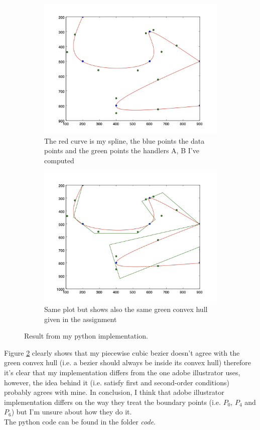 \documentclass[12pt]{article}
\begin{document}
\begin{figure}[H]
\centering
\begin{subfigure}{.5\textwidth}
  \centering
	\includegraphics[width=0.7\columnwidth]{result.jpg}
	\caption{The red curve is my spline, the blue points the data points and the green points the handlers A, B I've computed}
	\label{fig:result}
\end{subfigure}%
\begin{subfigure}{.5\textwidth}
 \centering
	\includegraphics[width=0.7\columnwidth]{convex_hull.jpg}
	\caption{Same plot but shows also the same green convex hull given in the assignment}
	\label{fig:result}
\end{subfigure}
\caption{Result from my python implementation. }
\label{fig:test}
\end{figure}

Figure \ref{fig:result} clearly shows that my piecewise cubic bezier doesn't agree with the green convex hull (i.e. a bezier should always be inside its convex hull) therefore it's clear that my implementation differs from the one adobe illustrator uses, however, the idea behind it (i.e. satisfy first and second-order conditions) probably agrees with mine. In conclusion, I think that adobe illustrator implementation differs on the way they treat the boundary points (i.e. $P_0$, $P_4$ and $P_6$) but I'm unsure about how they do it. \\

The python code can be found in the folder \textit{code}. \\
\end{document}
